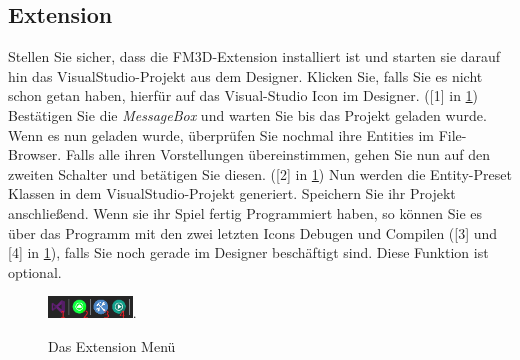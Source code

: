 \subsection{Extension}
Stellen Sie sicher, dass die FM3D-Extension installiert ist und starten sie darauf hin das VisualStudio-Projekt aus dem Designer. Klicken Sie, falls Sie es nicht schon getan haben, hierfür auf das Visual-Studio Icon im Designer. ([1] in \cref{extmen})
Bestätigen Sie die \textit{MessageBox} und warten Sie bis das Projekt geladen wurde.
Wenn es nun geladen wurde, überprüfen Sie nochmal ihre Entities im File-Browser. Falls alle ihren Vorstellungen übereinstimmen, gehen Sie nun auf den zweiten Schalter und betätigen Sie diesen. ([2] in \cref{extmen})
Nun werden die Entity-Preset Klassen in dem VisualStudio-Projekt generiert. Speichern Sie ihr Projekt anschließend.
Wenn sie ihr Spiel fertig Programmiert haben, so können Sie es über das Programm mit den zwei letzten Icons Debugen und Compilen ([3] und [4] in \cref{extmen}), falls Sie noch gerade im Designer beschäftigt sind. Diese Funktion ist optional.
\begin{figure}
	\begin{center}
		\includegraphics[width=0.2\textwidth]{04verwendung/Designer/02ExtensionMenu.PNG}.
		\caption{Das Extension Menü}\label{extmen}
	\end{center}
\end{figure}